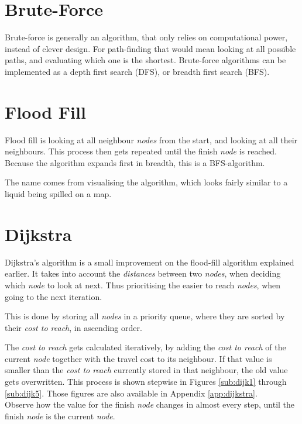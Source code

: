 \section{Brute-Force}\label{sec:brute}
Brute-force is generally an algorithm,
that only relies on computational power,
instead of clever design.
For path-finding that would mean looking at all possible paths,
and evaluating which one is the shortest.
Brute-force algorithms can be implemented as a depth first search (DFS), or breadth first search (BFS).

\section{Flood Fill}\label{sec:fill}
Flood fill is looking at all neighbour \emph{nodes} from the start,
and looking at all their neighbours.
This process then gets repeated until the finish \emph{node} is reached.
Because the algorithm expands first in breadth,
this is a BFS-algorithm.

The name comes from visualising the algorithm,
which looks fairly similar to a liquid being spilled on a map.
\cite{Jaimini2017}

\section{Dijkstra}\label{sec:dijkstra}
Dijkstra's algorithm is a small improvement on the flood-fill algorithm explained earlier.
It takes into account the \emph{distances} between two \emph{nodes},
when deciding which \emph{node} to look at next.
Thus prioritising the easier to reach \emph{nodes}, when going to the next iteration.

This is done by storing all \emph{nodes} in a priority queue,
where they are sorted by their \emph{cost to reach}, in ascending order.

The \emph{cost to reach} gets calculated iteratively,
by adding the \emph{cost to reach} of the current \emph{node} together with the travel cost to its neighbour.
If that value is smaller than the \emph{cost to reach} currently stored in that neighbour,
the old value gets overwritten.
This process is shown stepwise in Figures \ref{sub:dijk1} through \ref{sub:dijk5}.
Those figures are also available in Appendix \ref{app:dijkstra}.\\
Observe how the value for the finish \emph{node} changes in almost every step,
until the finish \emph{node} is the current \emph{node}.


